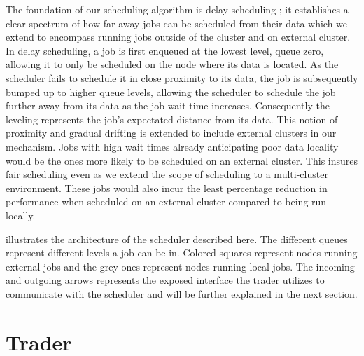 The foundation of our scheduling algorithm is delay scheduling
\cite{zaharia_delay_2010}; it establishes a clear spectrum of how far away jobs
can be scheduled from their data which we extend to encompass running jobs
outside of the cluster and on external cluster. In delay scheduling, a job is
first enqueued at the lowest level, queue zero, allowing it to only be
scheduled on the node where its data is located. As the scheduler fails to
schedule it in close proximity to its data, the job is subsequently bumped up
to higher queue levels, allowing the scheduler to schedule the job further away
from its data as the job wait time increases. Consequently the leveling
represents the job's expectated distance from its data. This notion of proximity
and gradual drifting is extended to include external clusters in our mechanism.
Jobs with high wait times already anticipating poor data locality would be the
ones more likely to be scheduled on an external cluster. This insures fair
scheduling even as we extend the scope of scheduling to a multi-cluster
environment. These jobs would also incur the least percentage reduction in
performance when scheduled on an external cluster compared to being run
locally.

 illustrates the architecture of the scheduler described here. The
different queues represent different levels a job can be in. Colored squares
represent nodes running external jobs and the grey ones represent nodes running
local jobs. The incoming and outgoing arrows represents the exposed interface
the trader utilizes to communicate with the scheduler and will be further
explained in the next section.






\section{Trader} \label{trader}

